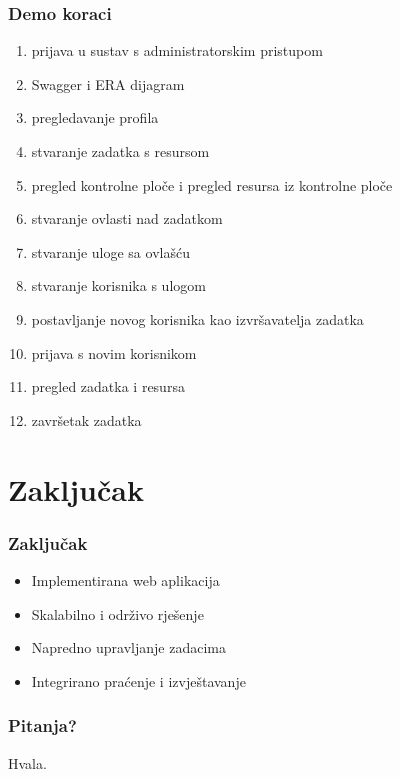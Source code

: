 \documentclass[aspectratio=169]{beamer}
\begin{document}
\begin{frame}
    \frametitle{Demo koraci}
    \begin{enumerate}
        \item prijava u sustav s administratorskim pristupom
        \item Swagger i ERA dijagram
        \item pregledavanje profila
        \item stvaranje zadatka s resursom
        \item pregled kontrolne ploče i pregled resursa iz kontrolne ploče
        \item stvaranje ovlasti nad zadatkom
        \item stvaranje uloge sa ovlašću
        \item stvaranje korisnika s ulogom
        \item postavljanje novog korisnika kao izvršavatelja zadatka
        \item prijava s novim korisnikom
        \item pregled zadatka i resursa
        \item završetak zadatka
    \end{enumerate}
\end{frame}

\section{Zaključak}

\begin{frame}
    \frametitle{Zaključak}
    \begin{itemize}
        \item Implementirana web aplikacija
        \item Skalabilno i održivo rješenje
        \item Napredno upravljanje zadacima
        \item Integrirano praćenje i izvještavanje
    \end{itemize}
\end{frame}

\begin{frame}
    \frametitle{Pitanja?}
    \begin{center}
        {\Huge Hvala.}
    \end{center}
\end{frame}
\end{document}
